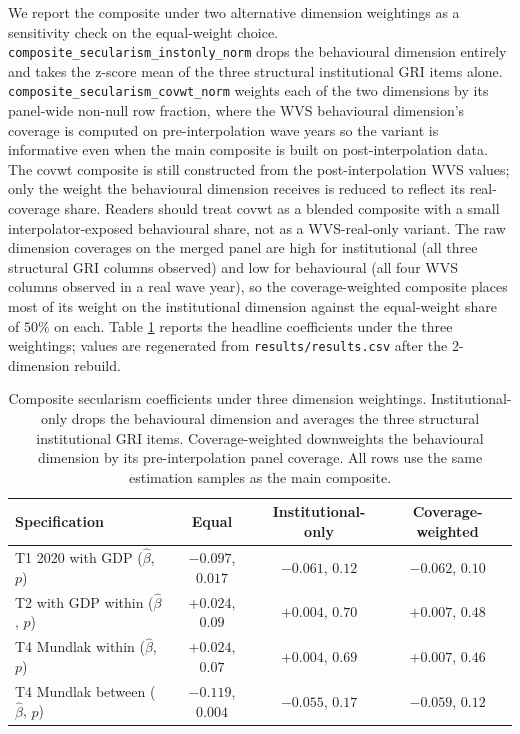 \documentclass[12pt,a4paper]{article}
\begin{document}
We report the composite under two alternative dimension weightings as a sensitivity check on the equal-weight choice. \texttt{composite\_secularism\_instonly\_norm} drops the behavioural dimension entirely and takes the z-score mean of the three structural institutional GRI items alone. \texttt{composite\_secularism\_covwt\_norm} weights each of the two dimensions by its panel-wide non-null row fraction, where the WVS behavioural dimension's coverage is computed on pre-interpolation wave years so the variant is informative even when the main composite is built on post-interpolation data. The covwt composite is still constructed from the post-interpolation WVS values; only the weight the behavioural dimension receives is reduced to reflect its real-coverage share. Readers should treat covwt as a blended composite with a small interpolator-exposed behavioural share, not as a WVS-real-only variant. The raw dimension coverages on the merged panel are high for institutional (all three structural GRI columns observed) and low for behavioural (all four WVS columns observed in a real wave year), so the coverage-weighted composite places most of its weight on the institutional dimension against the equal-weight share of $50\%$ on each. Table \ref{tab:weight-sensitivity} reports the headline coefficients under the three weightings; values are regenerated from \texttt{results/results.csv} after the 2-dimension rebuild.

\begin{table}[h!]
\centering
\caption{Composite secularism coefficients under three dimension weightings. Institutional-only drops the behavioural dimension and averages the three structural institutional GRI items. Coverage-weighted downweights the behavioural dimension by its pre-interpolation panel coverage. All rows use the same estimation samples as the main composite.}
\label{tab:weight-sensitivity}
\begin{tabular}{lccc}
\toprule
Specification & Equal & Institutional-only & Coverage-weighted \\
\midrule
T1 2020 with GDP ($\hat\beta$, $p$)      & $-0.097$, $0.017$   & $-0.061$, $0.12$    & $-0.062$, $0.10$   \\
T2 with GDP within ($\hat\beta$, $p$)    & $+0.024$, $0.09$    & $+0.004$, $0.70$    & $+0.007$, $0.48$   \\
T4 Mundlak within ($\hat\beta$, $p$)     & $+0.024$, $0.07$    & $+0.004$, $0.69$    & $+0.007$, $0.46$   \\
T4 Mundlak between ($\hat\beta$, $p$)    & $-0.119$, $0.004$   & $-0.055$, $0.17$    & $-0.059$, $0.12$   \\
\bottomrule
\end{tabular}
\end{table}
\end{document}

